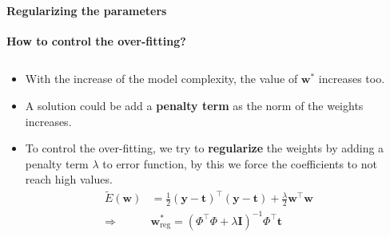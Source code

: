 \begin{frame}{\insertsubsection}
	\framesubtitle{Regularizing the parameters}
	\textcolor{UniGold}{\textbf{How to control the over-fitting?}}
	\begin{columns}
		\begin{column}{0.475\textwidth}
			\begin{itemize}	
			\item With the increase of the model complexity, the value of $\mathbf{w}^*$ increases too.
			\item A solution could be add a \textcolor{UniOrange}{\textbf{penalty term}} as the norm of the weights increases.
			\item To control the over-fitting, we try to \textcolor{UniOrange}{\textbf{regularize}} the weights by adding a penalty term $\lambda$ to error function, by this we force the coefficients to not reach high values.
			\begin{align*}
				\tilde{E}(\mathbf{w}) &=\frac{1}{2} (\mathbf{y}-\mathbf{t})^{\top}(\mathbf{y}-\mathbf{t}) +\frac{\lambda}{2} \mathbf{w}^{\top}\mathbf{w} \\
		\Rightarrow & \mathbf{w}^*_\text{reg} = \left( \Phi^{\top} \Phi + \lambda \mathbf{I} \right)^{-1} \Phi^{\top} \mathbf{t}
	\end{align*}			
			\end{itemize}
		\end{column}
		\begin{column}{0.475\textwidth}  %
			\centering
			\begin{animateinline}{5}

\end{animateinline}
\end{column}
\end{columns}
\end{frame}
